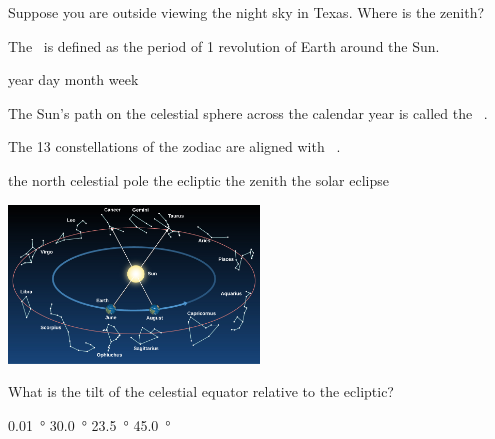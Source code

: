 \documentclass[addpoints]{exam}
\begin{document}
\begin{questions}
\question
Suppose you are outside viewing the night sky in Texas. Where is the zenith?





\question
The \fillin\ is defined as the period of 1 revolution of Earth around the Sun.

\begin{choices}
\correctchoice year
\choice day
\choice month
\choice week
\end{choices}

\question
The Sun's path on the celestial sphere across the calendar year is called the \fillin\ .


\question
The 13 constellations of the zodiac are aligned with \fillin \ .

\begin{minipage}{0.3\textwidth}
    \centering
    \begin{choices}
    \choice the north celestial pole
    \correctchoice the ecliptic
    \choice the zenith
    \choice the solar eclipse
    \end{choices}
\end{minipage}%
\begin{minipage}{0.6\textwidth}
    \centering
    \includegraphics[width=0.5\textwidth]{Figures/Figure2.6.jpg}
\end{minipage}
\vspace{1em}

\question
What is the tilt of the celestial equator relative to the ecliptic?

\begin{minipage}{0.3\textwidth}
    \centering
    \begin{choices}
    \choice \SI{0.01}{\degree} 
    \choice \SI{30.0}{\degree} 
    \correctchoice \SI{23.5}{\degree} 
    \choice \SI{45.0}{\degree} 
    \end{choices}
\end{minipage}%
\begin{minipage}{0.6\textwidth}
    \centering
\scalebox{0.8}{
\centering
\begin{tikzpicture}


\end{tikzpicture}}
\end{minipage}
\end{questions}
\end{document}
